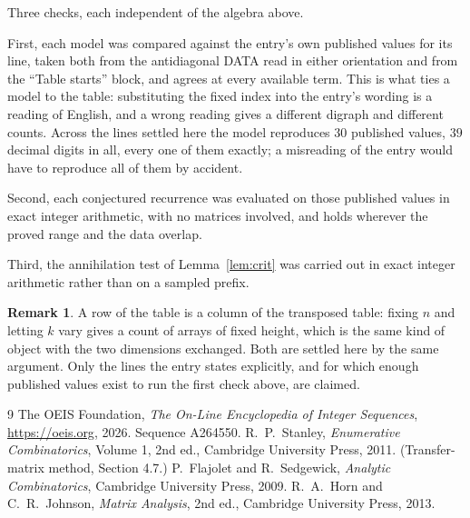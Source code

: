 \documentclass[11pt,a4paper]{article}
\theoremstyle{plain}
\theoremstyle{definition}
\newtheorem{remark}[theorem]{Remark}
\begin{document}
Three checks, each independent of the algebra above.

First, each model was compared against the entry's own published values for its line, taken
both from the antidiagonal DATA read in either orientation and from the ``Table starts''
block, and agrees at every available term. This is what ties a model to the table:
substituting the fixed index into the entry's wording is a reading of English, and a wrong
reading gives a different digraph and different counts. Across the lines settled here the
model reproduces $30$ published values, $39$ decimal digits in all, every one of
them exactly; a misreading of the entry would have to reproduce all of them by accident.

Second, each conjectured recurrence was evaluated on those published values in exact
integer arithmetic, with no matrices involved, and holds wherever the proved range and the
data overlap.

Third, the annihilation test of Lemma~\ref{lem:crit} was carried out in exact integer
arithmetic rather than on a sampled prefix.

\begin{remark}
A row of the table is a column of the transposed table: fixing $n$ and letting $k$ vary gives a
count of arrays of fixed height, which is the same kind of object with the two dimensions
exchanged. Both are settled here by the same argument. Only the lines the entry states
explicitly, and for which enough published values exist to run the first check above, are
claimed.
\end{remark}

\begin{thebibliography}{9}
 The OEIS Foundation, \emph{The On-Line Encyclopedia of Integer
Sequences}, \url{https://oeis.org}, 2026. Sequence A264550.
 R.~P.~Stanley, \emph{Enumerative Combinatorics}, Volume 1, 2nd ed.,
Cambridge University Press, 2011. (Transfer-matrix method, Section 4.7.)
 P.~Flajolet and R.~Sedgewick, \emph{Analytic Combinatorics}, Cambridge
University Press, 2009.
 R.~A.~Horn and C.~R.~Johnson, \emph{Matrix Analysis}, 2nd ed., Cambridge
University Press, 2013.
\end{thebibliography}
\end{document}

